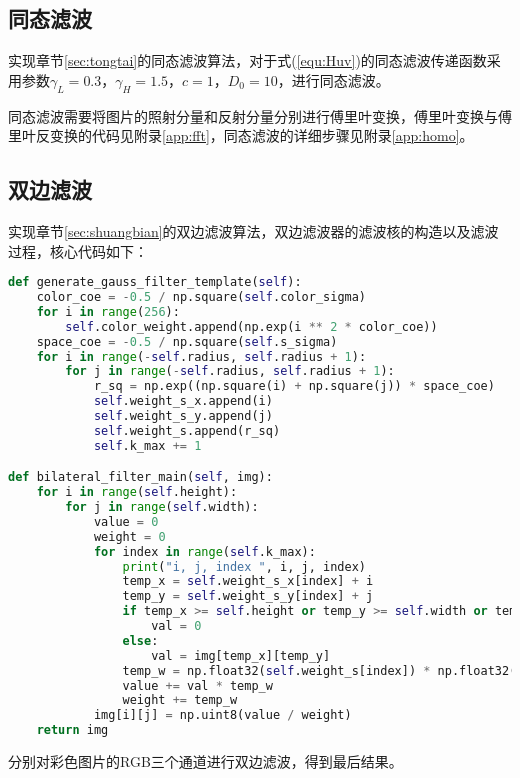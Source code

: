 \documentclass{hitreport}
\begin{document}
\subsection{同态滤波}\label{sec:tongtailv}

实现章节\ref{sec:tongtai}的同态滤波算法，对于式(\ref{equ:Huv})的同态滤波传递函数采用参数$\gamma_L=0.3$，$\gamma_H = 1.5$，$c=1$，$D_0=10$，进行同态滤波。

同态滤波需要将图片的照射分量和反射分量分别进行傅里叶变换，傅里叶变换与傅里叶反变换的代码见附录\ref{app:fft}，同态滤波的详细步骤见附录\ref{app:homo}。


\subsection{双边滤波}

实现章节\ref{sec:shuangbian}的双边滤波算法，双边滤波器的滤波核的构造以及滤波过程，核心代码如下：

\begin{lstlisting}[language=python]
def generate_gauss_filter_template(self):
    color_coe = -0.5 / np.square(self.color_sigma)
    for i in range(256):
        self.color_weight.append(np.exp(i ** 2 * color_coe))
    space_coe = -0.5 / np.square(self.s_sigma)
    for i in range(-self.radius, self.radius + 1):
        for j in range(-self.radius, self.radius + 1):
            r_sq = np.exp((np.square(i) + np.square(j)) * space_coe)
            self.weight_s_x.append(i)
            self.weight_s_y.append(j)
            self.weight_s.append(r_sq)
            self.k_max += 1

def bilateral_filter_main(self, img):
    for i in range(self.height):
        for j in range(self.width):
            value = 0
            weight = 0
            for index in range(self.k_max):
                print("i, j, index ", i, j, index)
                temp_x = self.weight_s_x[index] + i
                temp_y = self.weight_s_y[index] + j
                if temp_x >= self.height or temp_y >= self.width or temp_x < 0 or temp_y < 0:
                    val = 0
                else:
                    val = img[temp_x][temp_y]
                temp_w = np.float32(self.weight_s[index]) * np.float32(self.color_weight[np.abs(val - img[i][j])])
                value += val * temp_w
                weight += temp_w
            img[i][j] = np.uint8(value / weight)
    return img

\end{lstlisting}

分别对彩色图片的RGB三个通道进行双边滤波，得到最后结果。
\end{document}
